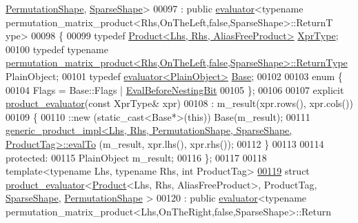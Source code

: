 \begin{DoxyCode}
      \hyperlink{struct_eigen_1_1_permutation_shape}{PermutationShape}, \hyperlink{struct_eigen_1_1_sparse_shape}{SparseShape}>
00097   : \textcolor{keyword}{public} \hyperlink{struct_eigen_1_1internal_1_1evaluator}{evaluator}<typename permutation\_matrix\_product<Rhs,OnTheLeft,false,SparseShape>::ReturnT
      ype>
00098 \{
00099   \textcolor{keyword}{typedef} \hyperlink{group___core___module_class_eigen_1_1_product}{Product<Lhs, Rhs, AliasFreeProduct>} 
      \hyperlink{group___core___module_class_eigen_1_1_product}{XprType};
00100   \textcolor{keyword}{typedef} \textcolor{keyword}{typename} 
      \hyperlink{struct_eigen_1_1internal_1_1permutation__matrix__product}{permutation\_matrix\_product<Rhs,OnTheLeft,false,SparseShape>::ReturnType}
       PlainObject;
00101   \textcolor{keyword}{typedef} \hyperlink{struct_eigen_1_1internal_1_1evaluator}{evaluator<PlainObject>} \hyperlink{struct_eigen_1_1internal_1_1evaluator}{Base};
00102 
00103   \textcolor{keyword}{enum} \{
00104     Flags = Base::Flags | \hyperlink{group__flags_gaa34e83bae46a8eeae4e69ebe3aaecbed}{EvalBeforeNestingBit}
00105   \};
00106 
00107   \textcolor{keyword}{explicit} \hyperlink{struct_eigen_1_1internal_1_1product__evaluator}{product\_evaluator}(\textcolor{keyword}{const} XprType& xpr)
00108     : m\_result(xpr.rows(), xpr.cols())
00109   \{
00110     ::new (static\_cast<Base*>(\textcolor{keyword}{this})) Base(m\_result);
00111     
      \hyperlink{struct_eigen_1_1internal_1_1generic__product__impl}{generic\_product\_impl<Lhs, Rhs, PermutationShape, SparseShape, ProductTag>::evalTo}
      (m\_result, xpr.lhs(), xpr.rhs());
00112   \}
00113 
00114 \textcolor{keyword}{protected}:
00115   PlainObject m\_result;
00116 \};
00117 
00118 \textcolor{keyword}{template}<\textcolor{keyword}{typename} Lhs, \textcolor{keyword}{typename} Rhs, \textcolor{keywordtype}{int} ProductTag>
\hyperlink{struct_eigen_1_1internal_1_1product__evaluator_3_01_product_3_01_lhs_00_01_rhs_00_01_alias_free_9d3be1aa43ce7749965c0caa1184b53c}{00119} \textcolor{keyword}{struct }\hyperlink{struct_eigen_1_1internal_1_1product__evaluator}{product\_evaluator}<\hyperlink{group___core___module_class_eigen_1_1_product}{Product}<Lhs, Rhs, AliasFreeProduct>, ProductTag, 
      \hyperlink{struct_eigen_1_1_sparse_shape}{SparseShape}, \hyperlink{struct_eigen_1_1_permutation_shape}{PermutationShape} >
00120   : \textcolor{keyword}{public} \hyperlink{struct_eigen_1_1internal_1_1evaluator}{evaluator}<typename permutation\_matrix\_product<Lhs,OnTheRight,false,SparseShape>::Return

\end{DoxyCode}
